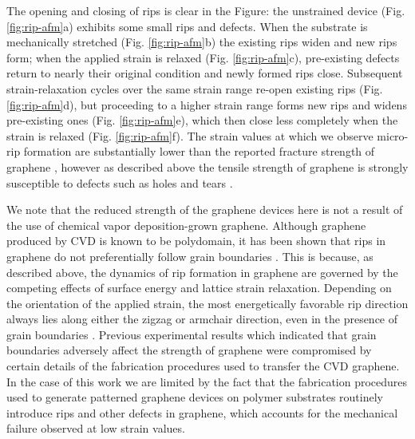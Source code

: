\documentclass[edeposit,fullpage,draftthesis]{uiucthesis2009}
\begin{document}
        The opening and closing of rips is clear in the Figure:  the unstrained device
        (Fig. \ref{fig:rip-afm}a) exhibits some small rips and defects. When the substrate is
        mechanically stretched (Fig. \ref{fig:rip-afm}b) the existing rips widen and new rips form;
        when the applied strain is relaxed (Fig. \ref{fig:rip-afm}c), pre-existing defects return to
        nearly their original condition and newly formed rips close. Subsequent
        strain-relaxation cycles over the same strain range re-open existing rips (Fig. \ref{fig:rip-afm}d), 
        but proceeding to a higher strain range forms new rips and widens
        pre-existing ones (Fig. \ref{fig:rip-afm}e), which then close less completely when the strain
        is relaxed (Fig. \ref{fig:rip-afm}f). The strain values at which we observe micro-rip formation
        are substantially lower than the reported fracture strength of
        graphene \cite{Lee2008}, however as described above the tensile strength of graphene is strongly
        susceptible to defects such as holes and tears \cite{lee2013high}. 
        
        We note that the reduced strength of the graphene devices here is not
        a result of the use of chemical vapor deposition-grown graphene. Although graphene
        produced by CVD is known to be polydomain, it has been shown that rips in
        graphene do not preferentially follow grain boundaries \cite{Kim2012}. 
        This is because, as described above, the dynamics of rip formation in graphene are governed by the competing
        effects of surface energy and lattice strain relaxation. Depending on the orientation of
        the applied strain, the most energetically favorable rip direction always lies along either
        the zigzag or armchair direction, even in the presence of grain boundaries \cite{lee2013high}.
        Previous experimental results which indicated that grain boundaries adversely affect
        the strength of graphene \cite{huang2011grains, ruiz2011softened} were compromised by
        certain details of the fabrication procedures used to transfer the CVD graphene.
        In the case of this work we are limited by the fact that 
        the fabrication procedures used to generate patterned graphene devices on
        polymer substrates routinely introduce rips and other defects in graphene,
        which accounts for the mechanical failure observed at low strain values.
 
\end{document}
